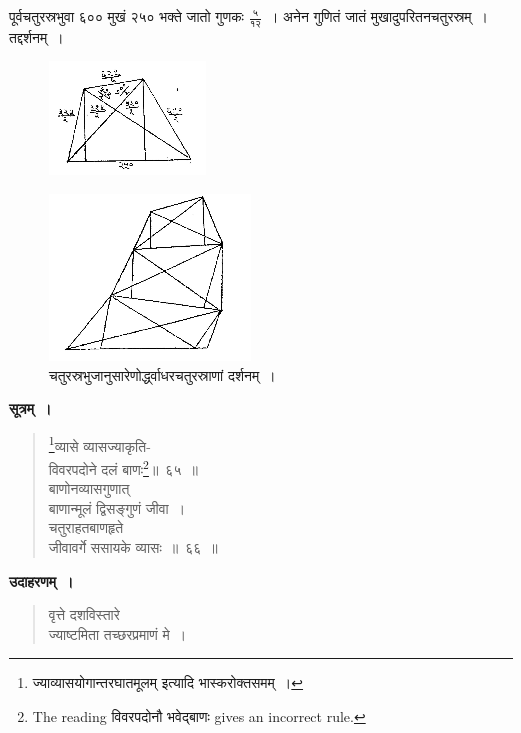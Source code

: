 \documentclass[11pt, openany]{book}
\begin{document}
 पूर्वचतुरस्रभुवा ६०० मुखं २५० भक्ते जातो गुणकः $\frac{\mbox{५}}{\mbox{१२}}$~। 
अनेन गुणितं जातं मुखादुपरितनचतुरस्रम्~। तद्दर्शनम्~। 
\vspace{-2mm}

\begin{figure}[h!]
    \centering
    \includegraphics[scale=0.85]{graphics/capture76.png}
\end{figure}
\newpage
 
\begin{figure}[h!]
    \centering
  \captionsetup{labelformat=empty}
 \caption{चतुरस्रभुजानुसारेणोर्द्ध्वाधरचतुरस्राणां दर्शनम्~।}
\vspace{-1mm}

    \includegraphics[scale=0.85]{graphics/capture77.png}
\end{figure}

 \textbf{सूत्रम्~।} 
\setcounter{footnote}{0}
\begin{quote}
    \bs 
     \footnote{{\color{violet}ज्याव्यासयोगान्तरघातमूलम्} इत्यादि {\color{violet}भास्करो}क्तसमम्~।}व्यासे व्यासज्याकृति-\\
     विवरपदोने दलं बाणः\footnote{The reading विवरपदोनौ भवेद्बाणः gives an incorrect rule.}॥~६५~॥ \\
बाणोनव्यासगुणात् \\
बाणान्मूलं द्विसङ्गुणं जीवा~।\\
चतुराहतबाणहृते \\
जीवावर्गे ससायके व्यासः~॥~६६~॥
\end{quote}

 \textbf{उदाहरणम्~।} 
\begin{quote}
    \bqt 
     वृत्ते दशविस्तारे \\
     ज्याष्टमिता तच्छरप्रमाणं मे~।
\end{quote}
\end{document}
